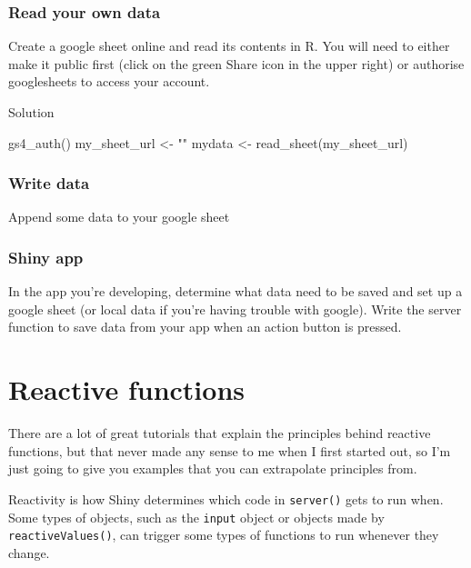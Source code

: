 \documentclass[
]{book}
\newenvironment{Shaded}{\begin{snugshade}}{\end{snugshade}}
\newcommand{\FunctionTok}[1]{\textcolor[rgb]{0.00,0.00,0.00}{#1}}
\newcommand{\NormalTok}[1]{#1}
\newcommand{\OtherTok}[1]{\textcolor[rgb]{0.56,0.35,0.01}{#1}}
\newcommand{\StringTok}[1]{\textcolor[rgb]{0.31,0.60,0.02}{#1}}
\begin{document}
\hypertarget{read-your-own-data}{%
\subsection{Read your own data}\label{read-your-own-data}}

Create a google sheet online and read its contents in R. You will need to either make it public first (click on the green Share icon in the upper right) or authorise googlesheets to access your account.

Solution

\begin{Shaded}
\begin{Highlighting}[]
\FunctionTok{gs4\_auth}\NormalTok{()}
\NormalTok{my\_sheet\_url }\OtherTok{\textless{}{-}} \StringTok{""}
\NormalTok{mydata }\OtherTok{\textless{}{-}} \FunctionTok{read\_sheet}\NormalTok{(my\_sheet\_url)}
\end{Highlighting}
\end{Shaded}

\hypertarget{write-data}{%
\subsection{Write data}\label{write-data}}

Append some data to your google sheet

\hypertarget{shiny-app}{%
\subsection{Shiny app}\label{shiny-app}}

In the app you're developing, determine what data need to be saved and set up a google sheet (or local data if you're having trouble with google). Write the server function to save data from your app when an action button is pressed.

\hypertarget{reactives}{%
\chapter{Reactive functions}\label{reactives}}

There are a lot of great tutorials that explain the principles behind reactive functions, but that never made any sense to me when I first started out, so I'm just going to give you examples that you can extrapolate principles from.

Reactivity is how Shiny determines which code in \texttt{server()} gets to run when. Some types of objects, such as the \texttt{input} object or objects made by \texttt{reactiveValues()}, can trigger some types of functions to run whenever they change.
\end{document}
